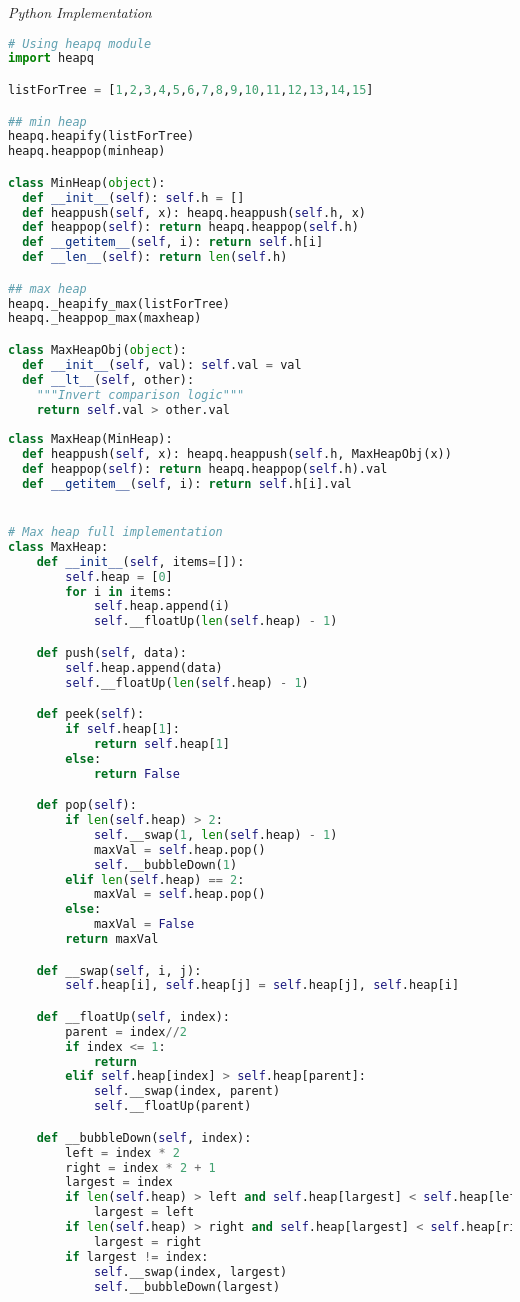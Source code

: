 \documentclass{article}
\begin{document}
\vspace{8pt} \emph{Python Implementation}
\begin{lstlisting}[language=Python]
# Using heapq module
import heapq

listForTree = [1,2,3,4,5,6,7,8,9,10,11,12,13,14,15]    

## min heap
heapq.heapify(listForTree)            
heapq.heappop(minheap)      

class MinHeap(object):
  def __init__(self): self.h = []
  def heappush(self, x): heapq.heappush(self.h, x)
  def heappop(self): return heapq.heappop(self.h)
  def __getitem__(self, i): return self.h[i]
  def __len__(self): return len(self.h)

## max heap
heapq._heapify_max(listForTree)       
heapq._heappop_max(maxheap) 

class MaxHeapObj(object):
  def __init__(self, val): self.val = val
  def __lt__(self, other): 
    """Invert comparison logic"""
    return self.val > other.val
  
class MaxHeap(MinHeap):
  def heappush(self, x): heapq.heappush(self.h, MaxHeapObj(x))
  def heappop(self): return heapq.heappop(self.h).val
  def __getitem__(self, i): return self.h[i].val


# Max heap full implementation
class MaxHeap:
    def __init__(self, items=[]):
        self.heap = [0]
        for i in items:
            self.heap.append(i)
            self.__floatUp(len(self.heap) - 1)

    def push(self, data):
        self.heap.append(data)
        self.__floatUp(len(self.heap) - 1)

    def peek(self):
        if self.heap[1]:
            return self.heap[1]
        else:
            return False

    def pop(self):
        if len(self.heap) > 2:
            self.__swap(1, len(self.heap) - 1)
            maxVal = self.heap.pop()
            self.__bubbleDown(1)
        elif len(self.heap) == 2:
            maxVal = self.heap.pop()
        else:
            maxVal = False
        return maxVal

    def __swap(self, i, j):
        self.heap[i], self.heap[j] = self.heap[j], self.heap[i]

    def __floatUp(self, index):
        parent = index//2
        if index <= 1:
            return
        elif self.heap[index] > self.heap[parent]:
            self.__swap(index, parent)
            self.__floatUp(parent)

    def __bubbleDown(self, index):
        left = index * 2
        right = index * 2 + 1
        largest = index
        if len(self.heap) > left and self.heap[largest] < self.heap[left]:
            largest = left
        if len(self.heap) > right and self.heap[largest] < self.heap[right]:
            largest = right
        if largest != index:
            self.__swap(index, largest)
            self.__bubbleDown(largest)

\end{lstlisting}
\end{document}
